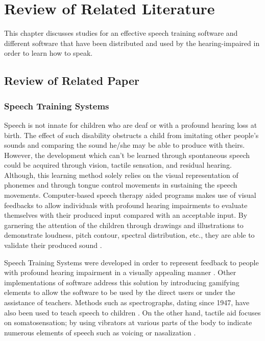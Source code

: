 %
%
%                 

\chapter{Review of Related Literature}
\label{sec:relatedlit}

This chapter discusses studies for an effective speech training software and different software that have been distributed and used by the hearing-impaired in order to learn how to speak.

\section{Review of Related Paper}

\subsection{Speech Training Systems}

Speech is not innate for children who are deaf or with a profound hearing loss at birth. The effect of such disability obstructs a child from imitating other people’s sounds and comparing the sound he/she may be able to produce with theirs. However, the development which can’t be learned through spontaneous speech could be acquired through vision, tactile sensation, and residual hearing. Although, this learning method solely relies on the visual representation of phonemes and through tongue control movements in sustaining the speech movements. Computer-based speech therapy aided programs makes use of visual feedbacks to allow individuals with profound hearing impairments to evaluate themselves with their produced input compared with an acceptable input. By garnering the attention of the children through drawings and illustrations to demonstrate loudness, pitch contour, spectral distribution, etc., they are able to validate their produced sound \cite{oster:2006:cbs}.

Speech Training Systems were developed in order to represent feedback to people with profound hearing impairment in a visually appealing manner \cite{oster:2006:cbs}. Other implementations of software address this solution by introducing gamifying elements to allow the software to be used by the direct users or under the assistance of teachers. Methods such as spectrographs, dating since 1947, have also been used to teach speech to children \cite{javkin:1993:msa}. On the other hand, tactile aid focuses on somatosensation; by using vibrators at various parts of the body to indicate numerous elements of speech such as voicing or nasalization \cite{wankhede:2014:dvs}.

